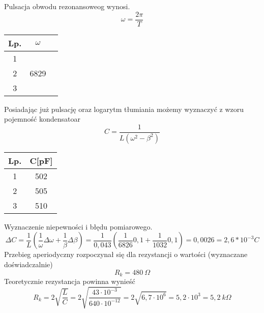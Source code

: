 \documentclass[11pt]{article}
\begin{document}
\begin{multicols}{2}
Pulsacja obwodu rezonansoweog wynosi.
$$ \omega = \frac{2\pi}{T}  $$
\begin{center}
\begin{tabular}{|c|c|c|}
\hline
Lp. & $\omega$  \\  
\hline
1 & \multirow{3}{*}{6829}\\
2 & \\
3 & \\
\hline
\end{tabular}
\end{center}
\end{multicols}
Posiadając już pulsację oraz logarytm tłumiania możemy wyznaczyć z wzoru pojemność kondensatoar
$$ C = \frac{1}{L( \omega^2 - \beta^2)} $$

\begin{center}
\begin{tabular}{|c|c|}\hline
Lp. & C[pF] \\  
\hline
1 & 502\\
2 & 505\\
3 & 510\\
\hline
\end{tabular}
\end{center}

\newpage
Wyznaczenie niepewności i błędu pomiarowego.
$$ \Delta C = \frac{1}{L}\left(\frac{1}{\omega}\Delta \omega + \frac{1}{\beta}\Delta \beta \right) = \frac{1}{0,043}(\frac{1}{6826}0,1 + \frac{1}{1032}0,1) = 0,0026 = 2,6*10^{-3} C $$
\bigskip
Przebieg aperiodyczny rozpoczynał się dla rezystancji o wartości (wyznaczane doświadczalnie)
$$ R_k = 480 \ \Omega $$
Teoretycznie rezystancja powinna wynieść
$$ R_k = 2 \sqrt{\frac{L}{C}} = 2 \sqrt{\frac{43 \cdot 10^{-3}}{640 \cdot 10^{-12}}} = 2\sqrt{6,7 \cdot 10^{6}} =  5,2 \cdot 10^{3} = 5,2\ k\Omega $$
\end{document}
